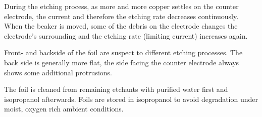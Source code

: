 During the etching process, as more and more copper settles on the counter electrode, the current and therefore the etching rate decreases continuously. When the beaker is moved, some of the debris on the electrode changes the electrode's surrounding and the etching rate (limiting current) increases again. 
	
	Front- and backside of the foil are suspect to different etching processes. The back side is generally more flat, the side facing the counter electrode always shows some additional protrusions.

The foil is cleaned from remaining etchants with purified water first and isopropanol afterwards. Foils are stored in isopropanol to avoid degradation under moist, oxygen rich ambient conditions. 
	
	\label{sec:foil-SEM}
%	
	

